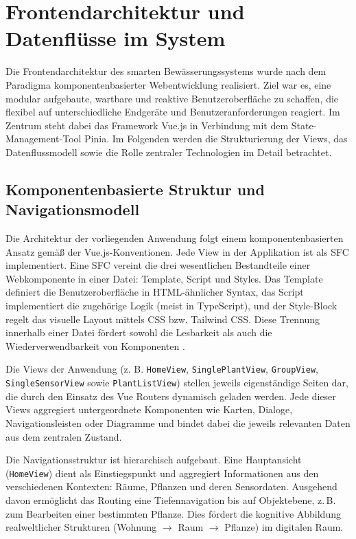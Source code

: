 \section{Frontendarchitektur und Datenflüsse im System}
Die Frontendarchitektur des smarten Bewässerungssystems wurde nach dem Paradigma komponentenbasierter Webentwicklung realisiert. Ziel war es, eine modular aufgebaute, wartbare und reaktive Benutzeroberfläche zu schaffen, die flexibel auf unterschiedliche Endgeräte und Benutzeranforderungen reagiert. Im Zentrum steht dabei das Framework Vue.js in Verbindung mit dem State-Management-Tool Pinia. Im Folgenden werden die Strukturierung der Views, das Datenflussmodell sowie die Rolle zentraler Technologien im Detail betrachtet.

\subsection{Komponentenbasierte Struktur und Navigationsmodell}
Die Architektur der vorliegenden Anwendung folgt einem komponentenbasierten Ansatz gemäß der Vue.js-Konventionen. Jede View in der Applikation ist als \ac{SFC} implementiert. Eine \ac{SFC} vereint die drei wesentlichen Bestandteile einer Webkomponente in einer Datei: Template, Script und Styles. Das Template definiert die Benutzeroberfläche in HTML-ähnlicher Syntax, das Script implementiert die zugehörige Logik (meist in TypeScript), und der Style-Block regelt das visuelle Layout mittels CSS bzw. Tailwind CSS. Diese Trennung innerhalb einer Datei fördert sowohl die Lesbarkeit als auch die Wiederverwendbarkeit von Komponenten \cite{VueGuide2024}.

Die Views der Anwendung (z. B.	\texttt{HomeView}, 	\texttt{SinglePlantView}, 	\texttt{GroupView}, 	\texttt{SingleSensorView} sowie 	\texttt{PlantListView}) stellen jeweils eigenständige Seiten dar, die durch den Einsatz des Vue Routers dynamisch geladen werden. Jede dieser Views aggregiert untergeordnete Komponenten wie Karten, Dialoge, Navigationsleisten oder Diagramme und bindet dabei die jeweils relevanten Daten aus dem zentralen Zustand.

Die Navigationsstruktur ist hierarchisch aufgebaut. Eine Hauptansicht (\texttt{HomeView}) dient als Einstiegspunkt und aggregiert Informationen aus den verschiedenen Kontexten: Räume, Pflanzen und deren Sensordaten. Ausgehend davon ermöglicht das Routing eine Tiefennavigation bis auf Objektebene, z.\,B. zum Bearbeiten einer bestimmten Pflanze. Dies fördert die kognitive Abbildung realweltlicher Strukturen (Wohnung $\rightarrow$ Raum $\rightarrow$ Pflanze) im digitalen Raum.
 
